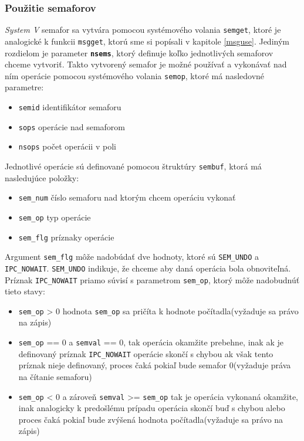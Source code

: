 \subsubsection{Použitie semaforov} \label{smaforuse}
\textit{System V} semafor sa vytvára pomocou systémového volania \texttt{semget}, ktoré je analogické k funkcii \texttt{msgget}, ktorú sme si popísali v kapitole \ref{msguse}. Jediným rozdielom je parameter \textbf{\texttt{nsems}}, ktorý definuje koľko jednotlivých semaforov chceme vytvoriť.\cite{semget}
Takto vytvorený semafor je možné používať a vykonávať nad ním operácie pomocou systémového volania \texttt{semop}, ktoré má nasledovné parametre:
\begin{itemize}
\item \texttt{semid} identifikátor semaforu
\item \texttt{sops} operácie nad semaforom
\item \texttt{nsops} počet operácii v poli
\end{itemize}
Jednotlivé operácie sú definované pomocou štruktúry \texttt{sembuf}, ktorá má nasledujúce položky:
\begin{itemize}
\item \texttt{sem\_num} číslo semaforu nad ktorým chcem operáciu vykonať
\item \texttt{sem\_op} typ operácie
\item \texttt{sem\_flg} príznaky operácie
\end{itemize}
Argument \texttt{sem\_flg} môže nadobúdať dve hodnoty, ktoré sú \texttt{SEM\_UNDO} a \texttt{IPC\_NOWAIT}. \texttt{SEM\_UNDO} indikuje, že chceme aby daná operácia bola obnoviteľná. Príznak \texttt{IPC\_NOWAIT} priamo súvisí s parametrom \texttt{sem\_op}, ktorý môže nadobudnúť tieto stavy\cite{semop}:
\begin{itemize}
\item \texttt{sem\_op} > 0 hodnota \texttt{sem\_op} sa pričíta k hodnote počítadla(vyžaduje sa právo na zápis)
\item \texttt{sem\_op} == 0 a \texttt{semval} == 0, tak operácia okamžite prebehne, inak ak je definovaný príznak \texttt{IPC\_NOWAIT} operácie skončí s chybou ak však tento príznak nieje definovaný, proces čaká pokiaľ bude semafor 0(vyžaduje práva na čítanie semaforu)
\item \texttt{sem\_op} < 0 a zároveň \texttt{semval} >= \texttt{sem\_op} tak je operácia vykonaná okamžite, inak analogicky k predošlému prípadu operácia skončí buď s chybou alebo proces čaká pokiaľ bude zvýšená hodnota počítadla(vyžaduje sa právo na zápis)
\end{itemize}
